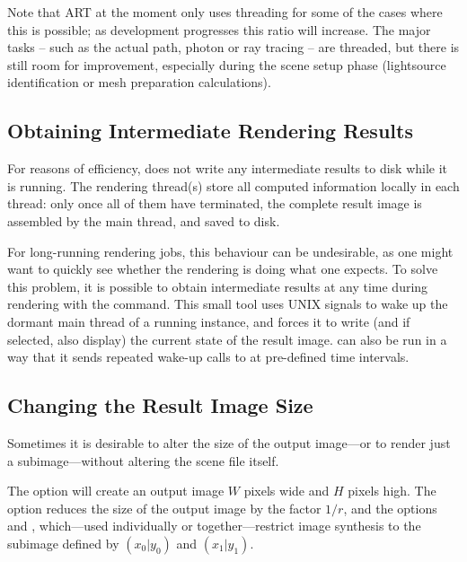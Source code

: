 Note that ART at the moment only uses threading for some of the cases
where this is possible; as development progresses this ratio will
increase. The major tasks -- such as the actual path, photon or ray
tracing -- are threaded, but there is still room for improvement,
especially during the scene setup phase (\eg lightsource
identification or mesh preparation calculations).

\subsection{Obtaining Intermediate Rendering Results}
For reasons of efficiency,  does not write any intermediate results to disk while it is running. The rendering thread(s) store all computed information locally in each thread: only once all of them have terminated, the complete result image is assembled by the main thread, and saved to disk. 

For long-running rendering jobs, this behaviour can be undesirable, as one might want to quickly see whether the rendering is doing what one expects. To solve this problem, it is possible to obtain intermediate results at any time during rendering with the  command. This small tool uses UNIX signals to wake up the dormant main thread of a running  instance, and forces it to write (and if selected, also display) the current state of the result image.  can also be run in a way that it sends repeated wake-up calls to  at pre-defined time intervals.

\subsection{Changing the Result Image Size}
\label{sec:using:imageSize}
Sometimes it is desirable to alter the size of the output image---or
to render just a subimage---without altering the scene file itself.

The option  will create an output image $W$ pixels
wide and $H$ pixels high.  The option  reduces the
size of the output image by the factor $1/r$, and the options
 and , which---used individually or
together---restrict image synthesis to the subimage defined by
$(x_0|y_0)$ and $(x_1|y_1)$.  

